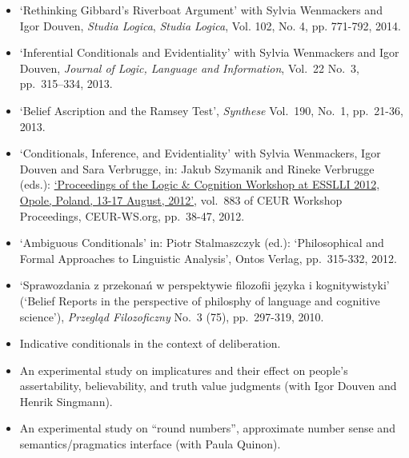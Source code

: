 \documentclass[a4paper,12pt]{article}
\begin{document}
\begin{small}
\begin{itemize}
  \end{itemize}


  \begin{itemize}
    \item `Rethinking Gibbard's Riverboat Argument' with Sylvia
    Wenmackers and Igor Douven, \emph{Studia Logica}, \emph{Studia Logica}, Vol. 102,
No. 4, pp. 771-792, 2014.

   \item `Inferential Conditionals and Evidentiality' with Sylvia
    Wenmackers and Igor Douven, \emph{Journal of Logic, Language and Information}, Vol.~22 No.~3, pp.~315–334, 2013.

  \item `Belief Ascription and the Ramsey Test', \emph{Synthese}
    Vol.~190, No.~1, pp.~21-36, 2013. %

  \item `Conditionals, Inference, and Evidentiality' with Sylvia
    Wenmackers, Igor Douven and Sara Verbrugge, in: Jakub Szymanik and
    Rineke Verbrugge (eds.):
    \href{http://ceur-ws.org/Vol-883/}{`Proceedings of the Logic \&
      Cognition Workshop at ESSLLI 2012, Opole, Poland, 13-17 August,
      2012'}, vol.~883 of CEUR Workshop Proceedings, CEUR-WS.org,
    pp.~38-47, 2012.

  \item `Ambiguous Conditionals' in: Piotr Stalmaszczyk (ed.):
    `Philosophical and Formal Approaches to Linguistic Analysis',
    Ontos Verlag, pp.~315-332, 2012.

  \item `Sprawozdania z przekonań w perspektywie filozofii języka i
    kognitywistyki' (`Belief Reports in the perspective of philosphy
    of language and cognitive science'), \emph{Przegląd Filozoficzny}
    No.~3 (75), pp.~297-319, 2010.

  \end{itemize}

  \begin{itemize}
   \item Indicative conditionals in the context of deliberation.
   \item An experimental study on implicatures and their effect on people's assertability, believability, and truth value judgments (with Igor Douven and Henrik Singmann).
   \item An experimental study on ``round numbers'', approximate number sense and semantics/pragmatics interface (with Paula Quinon).
  \end{itemize}
  


\end{small}
\end{document}
